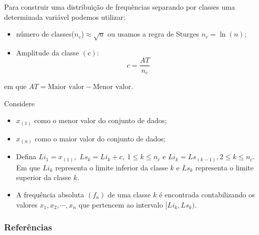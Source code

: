 \documentclass[12pt]{beamer}
\begin{document}
\begin{frame}{}
\frametitle{}
\begin{block}{}
\justifying
Para construir uma distribuição de frequências separando por classes uma determinada variável podemos utilizar:
\begin{itemize}
	\justifying
\item número de classes($n_{c}$)$\approx \sqrt{n}$ ou usamos a regra de Sturges $n_{c}=\ln{(n)};$\pause
\item Amplitude da classe $(c)$: $$c=\dfrac{AT}{n_{c}}$$ 
\end{itemize}
em que $AT=\textrm{Maior valor} - \textrm{Menor valor}.$
\end{block}
\end{frame}

\begin{frame}{}
\begin{block}{}
Considere
\begin{itemize}
    \item $x_{(1)}$ como o menor valor do conjunto de dados;
    \item $x_{(n)}$ como o maior valor do conjunto de dados; 
\end{itemize}
\end{block}
\vspace{-0.5cm}
\pause
\begin{block}{}
\begin{itemize}
	\justifying
\item Defina $Li_{1}=x_{(1)},$ $Ls_{k}=Li_{k}+c,\ 1\leq k \leq n_{c}$ e
$Li_{k}=Ls_{(k-1)},2 \leq k \leq n_{c}.$ Em que $Li_{k}$ representa o limite inferior da classe $k$ e $Ls_{k}$ representa o limite superior da classe $k.$\pause
\item A frequência absoluta $(f_{a})$ de uma classe $k$ é encontrada contabilizando os valores $x_{1},x_{2},\cdots,x_{n}$ que pertencem ao intervalo $[Li_{k},Ls_{k}).$
\end{itemize}
\end{block}
\end{frame}


\begin{frame}%
\frametitle{\bf Referências}
\printbibliography
\end{frame}
\end{document}
